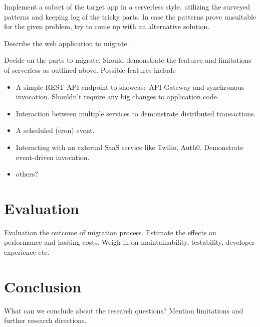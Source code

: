 \documentclass[utf8,english]{gradu3}
\begin{document}
Implement a subset of the target app in a serverless style, utilizing the surveyed patterns and keeping log of the tricky parts. In case the patterns prove unsuitable for the given problem, try to come up with an alternative solution.

Describe the web application to migrate.

Decide on the parts to migrate. Should demonstrate the features and limitations of serverless as outlined above. Possible features include
\begin{itemize}
  \item A simple REST API endpoint to showcase API Gateway and synchronous invocation. Shouldn't require any big changes to application code.
  \item Interaction between multiple services to demonstrate distributed transactions.
  \item A scheduled (cron) event.
  \item Interacting with an external SaaS service like Twilio, Auth0. Demonstrate event-driven invocation.
  \item others?
\end{itemize}

\chapter{Evaluation}

Evaluation the outcome of migration process. Estimate the effects on performance and hosting costs. Weigh in on maintainability, testability, developer experience etc.

\chapter{Conclusion}

What can we conclude about the research questions? Mention limitations and further research directions.

\printbibliography
\end{document}

